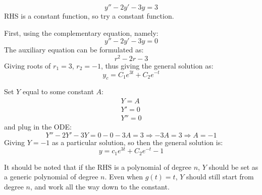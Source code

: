 \documentclass[12pt]{article}
\begin{document}
\begin{example}
  \begin{equation*}
    y'' - 2y' - 3y = 3
  \end{equation*}
  RHS is a constant function, so try a constant function.

  First, using the complementary equation, namely:
  \begin{equation*}
    y'' - 2y' - 3y = 0
  \end{equation*}
  The auxiliary equation can be formulated as:
  \begin{equation*}
    r^2 - 2r - 3
  \end{equation*}
  Giving roots of $r_1=3$, $r_2=-1$, thus giving the general solution as:
  \begin{equation*}
    y_c = C_1e^{3t} + C_2e^{-t}
  \end{equation*}

  Set $Y$ equal to some constant $A$:
  \begin{align*}
    Y = A   \\
    Y' = 0  \\
    Y'' = 0
  \end{align*}
  and plug in the ODE:
  \begin{equation*}
    Y'' - 2Y' - 3Y = 0 - 0 - 3A = 3 \Rightarrow -3A = 3 \Rightarrow A = -1
  \end{equation*}
  Giving $Y=-1$ as a particular solution, so then the general solution is:
  \begin{equation*}
    y = c_1e^{3t} + C_2e^{-t} - 1
  \end{equation*}
\end{example}
It should be noted that if the RHS is a polynomial of degree $n$, $Y$ should be set as a generic polynomial of degree $n$. Even when $g(t) = t$, $Y$ should still start from degree $n$, and work all the way down to the constant.
\end{document}
